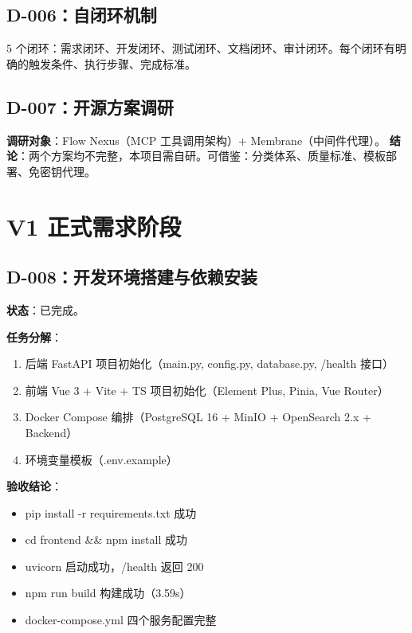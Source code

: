 \documentclass[11pt,a4paper]{article}
\begin{document}
\subsection{D-006：自闭环机制}

5 个闭环：需求闭环、开发闭环、测试闭环、文档闭环、审计闭环。每个闭环有明确的触发条件、执行步骤、完成标准。

\subsection{D-007：开源方案调研}

\textbf{调研对象}：Flow Nexus（MCP 工具调用架构）+ Membrane（中间件代理）。
\textbf{结论}：两个方案均不完整，本项目需自研。可借鉴：分类体系、质量标准、模板部署、免密钥代理。

\section{V1 正式需求阶段}

\subsection{D-008：开发环境搭建与依赖安装}

\textbf{状态}：已完成。

\textbf{任务分解}：
\begin{enumerate}[nosep]
  \item 后端 FastAPI 项目初始化（main.py, config.py, database.py, /health 接口）
  \item 前端 Vue 3 + Vite + TS 项目初始化（Element Plus, Pinia, Vue Router）
  \item Docker Compose 编排（PostgreSQL 16 + MinIO + OpenSearch 2.x + Backend）
  \item 环境变量模板（.env.example）
\end{enumerate}

\textbf{验收结论}：
\begin{itemize}[nosep]
  \item[\checkmark] pip install -r requirements.txt 成功
  \item[\checkmark] cd frontend \&\& npm install 成功
  \item[\checkmark] uvicorn 启动成功，/health 返回 200
  \item[\checkmark] npm run build 构建成功（3.59s）
  \item[\checkmark] docker-compose.yml 四个服务配置完整
\end{itemize}
\end{document}

